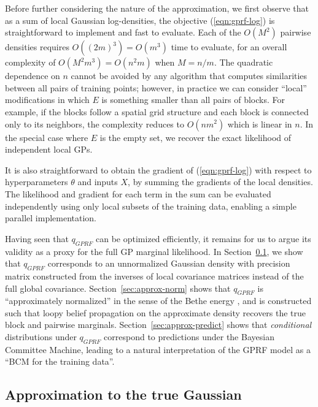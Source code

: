 \documentclass{article}
\begin{document}
Before further considering the nature of the approximation, we first
observe that as a sum of local Gaussian log-densities, the objective (\ref{eqn:gprf-log})
is straightforward to implement and fast to evaluate. Each of the $O(M^2)$
pairwise densities requires $O((2m)^3) = O(m^3)$ time to evaluate, for an overall complexity of
$O(M^2m^3) = O(n^2m)$ when $M=n/m$. The quadratic dependence on $n$ cannot
be avoided by any algorithm that computes similarities between all
pairs of training points; however, in practice we can consider ``local''
modifications in which $E$ is something smaller than all
pairs of blocks. For example, if the blocks follow a spatial grid structure and
each block is connected only to its neighbors, the complexity reduces
to $O(nm^2)$ which is linear in $n$. In the special case where $E$ is the empty
set, we recover the exact likelihood of independent local GPs.

It is also straightforward to obtain the gradient of
(\ref{eqn:gprf-log}) with respect to hyperparameters $\theta$ and inputs $X$, by summing
the gradients of the local densities. The likelihood and gradient for each term in the sum
can be evaluated independently using only local subsets of the
training data, enabling a simple parallel implementation. 

Having seen that $q_{GPRF}$ can be optimized efficiently, it remains
for us to argue its validity as a proxy for the full GP marginal
likelihood. In Section~\ref{sec:approx-gaussian}, we show that $q_{GPRF}$ 
corresponds to an unnormalized Gaussian density with precision matrix
constructed from the inverses of local covariance matrices instead of
the full global covariance.  Section~\ref{sec:approx-norm} shows that
$q_{GPRF}$ is ``approximately normalized'' in the sense of the Bethe
energy \cite{yedidia2001bethe}, and is constructed such that loopy belief
propagation on the approximate density recovers the true block and
pairwise marginals. Section~\ref{sec:approx-predict} shows that {\em
  conditional} distributions under $q_{GPRF}$ correspond to
predictions under the Bayesian Committee Machine, leading to a natural
interpretation of the GPRF model as a ``BCM for the training data''.


\subsection{Approximation to the true Gaussian}
\label{sec:approx-gaussian}
\end{document}
